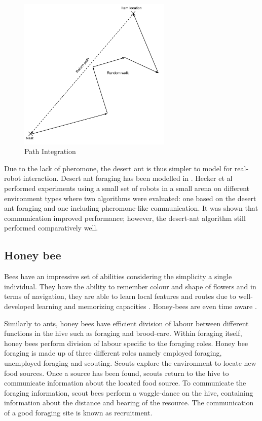 \begin{figure} [h]
	\centering
	\includegraphics[width=0.65\textwidth]{chapters/chapter2/figures/PathIntegration.pdf}
	\caption{Path Integration }
	\label{pathintegration}
\end{figure}

Due to the lack of pheromone, the desert ant is thus simpler to model for real-robot interaction. Desert ant foraging has been modelled in \cite{moller1998modeling,hecker2012formica,}. Hecker et al \cite{hecker2012formica} performed experiments using a small set of robots in a small arena on different environment types where two algorithms were evaluated: one based on the desert ant foraging and one including pheromone-like communication. It was shown that communication improved performance; however, the desert-ant algorithm still performed comparatively well. 

\subsection{Honey bee}

Bees have an impressive set of abilities considering the simplicity a single individual. They have the ability to remember colour and shape of flowers \cite{zhang2006honeybee} and in terms of navigation, they are able to learn local features and routes due to well-developed learning and memorizing capacities \cite{menzel2001cognitive}. Honey-bees are even time aware \cite{moore1989influence}. 

Similarly to ants, honey bees have efficient division of labour between different functions in the hive such as foraging and brood-care. Within foraging itself, honey bees perform division of labour specific to the foraging roles. Honey bee foraging is made up of three different roles \cite{seeley2009wisdom} namely employed foraging, unemployed foraging and scouting. Scouts explore the environment to locate new food sources. Once a source has been found, scouts return to the hive to communicate information about the located food source. To communicate the foraging information, scout bees perform a waggle-dance on the hive, containing information about the distance and bearing of the resource. The communication of a good foraging site is known as recruitment. 

